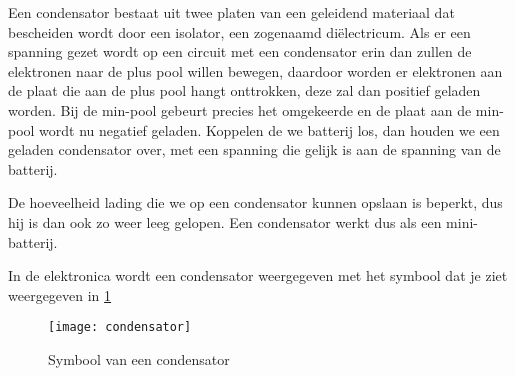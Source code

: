 Een condensator bestaat uit twee platen van een geleidend materiaal dat bescheiden wordt door een isolator, een zogenaamd di\"electricum. Als er een spanning gezet wordt op een circuit met een condensator erin dan zullen de elektronen naar de plus pool willen bewegen, daardoor worden er elektronen aan de plaat die aan de plus pool hangt onttrokken, deze zal dan positief geladen worden. Bij de min-pool gebeurt precies het omgekeerde en de plaat aan de min-pool wordt nu negatief geladen. Koppelen de we batterij los, dan houden we een geladen condensator over, met een spanning die gelijk is aan de spanning van de batterij.

De hoeveelheid lading die we op een condensator kunnen opslaan is beperkt, dus hij is dan ook zo weer leeg gelopen. Een condensator werkt dus als een mini-batterij.

In de elektronica wordt een condensator weergegeven met het symbool dat je ziet weergegeven in \ref{symbool:condensator}

\begin{figure}[h]
\texttt{[image: condensator]}
\centering
\caption{Symbool van een condensator}
\label{symbool:condensator}
\end{figure}


